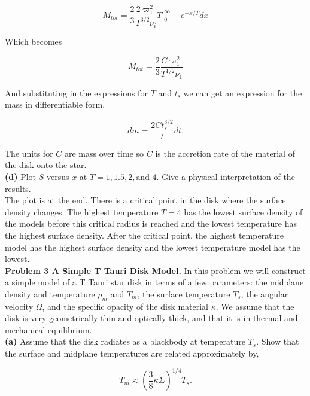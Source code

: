 \documentclass[12pt]{article}
\begin{document}
\begin{equation}
M_{tot} = \frac{2}{3}\frac{2\varpi_1^2}{T^{3/2}\nu_i} T |_0^\infty - e^{-x/T} dx 
\end{equation}

\noindent Which becomes 

\begin{equation}
M_{tot} = \frac{2}{3} \frac{C \varpi_1^2}{T^{1/2}\nu_1}
\end{equation}

\noindent And substituting in the expressions for $T$ and $t_s$ we can get an expression for the mass in differentiable form,

\begin{equation}
dm = \frac{2Ct_s^{3/2}}{t} dt.
\end{equation}

\noindent The units for $C$ are mass over time so $C$ is the accretion rate of the material of the disk onto the star. \\


\noindent \textbf{(d)} Plot $S$ versus $x$ at $T = 1, 1.5, 2, \text{and } 4$. Give a physical interpretation of the results. \\

\noindent The plot is at the end. There is a critical point in the disk where the surface density changes. The highest temperature $T = 4$ has the lowest surface density of the models before this critical radius is reached and the lowest temperature has the highest surface density. After the critical point, the highest temperature model has the highest surface density and the lowest temperature model has the lowest.\\

\noindent \textbf{Problem 3 A Simple T Tauri Disk Model.} In this problem we will construct a simple model of a T Tauri star disk in terms of a few parameters: the midplane density and temperature $\rho_m$ and $T_m$, the surface temperature $T_s$, the angular velocity $\Omega$, and the specific opacity of the disk material $\kappa$. We assume that the disk is very geometrically thin and optically thick, and that it is in thermal and mechanical equilibrium. \\

\noindent \textbf{(a)} Assume that the disk radiates as a blackbody at temperature $T_s$. Show that the surface and midplane temperatures are related approximately by, 

\begin{equation}
T_m \approx \left( \frac{3}{8} \kappa \Sigma \right)^{1/4} T_s.
\end{equation}
\end{document}
